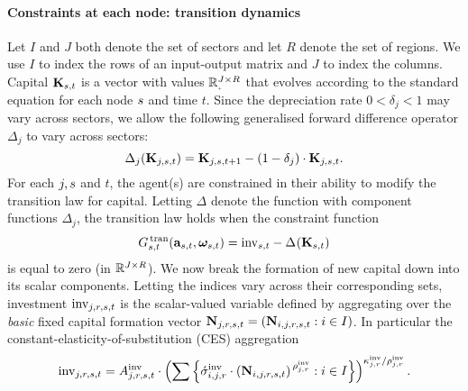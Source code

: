 \documentclass[12pt,a4paper,twoside, draft]{article}
\begin{document}
\paragraph{Constraints at each node: transition dynamics}
Let $I$ and $J$ both denote the set of sectors and let $R$ denote the set of
regions.
We use $I$ to index the rows of an input-output matrix and $J$ to index the
columns.
Capital $\mathbf{K}_{{s}, t}$ is a vector with values
$\nnreal ^ {J \times R}$ that evolves according to the standard equation for
each node ${s}$ and time $t$.
Since the depreciation rate $0 < \delta_{j} < 1$ may vary across sectors, we
allow the following generalised forward difference operator $\Delta_j$ to vary
across sectors:
\[
  \Delta_{j}(\mathbf{K}_{j, {s}, t})
    = \mathbf{K}_{j, {s}, t + 1} -
      (1 - \delta_j) \cdot \mathbf{K}_{j, {s}, t}. 
\]
For each $j, {s} $ and $t$, the agent(s) are constrained in their ability to
modify the transition law for capital.
Letting $\Delta$ denote the function with component functions
$\Delta_{j}$, the transition law holds when the constraint function
\begin{equation}\label{eq-kapital}
  G_{{s}, t}^{\,\textup{tran}}(
    \mathbf{a}_{{s}, t}, \boldsymbol{\omega}_{{s}, t}
  )
    = \textup{inv}_{{s}, t}
      - \Delta_{}(\mathbf{K}_{{s}, t})
\end{equation}
is equal to zero (in $\mathbb R^{J \times R}$).
We now break the formation of new capital down into its scalar components.
Letting the indices vary across their corresponding sets, investment
$\textup{inv}_{j, r, {s}, t}$ is the scalar-valued variable defined by
aggregating over the \emph{basic} fixed capital formation vector
$\mathbf{N}_{j, r, {s}, t} = (\mathbf{N}_{i,j, r, {s}, t}: i \in I)$.
In particular the constant-elasticity-of-substitution (CES) aggregation
\begin{equation}\label{eq-ces-inv}
  \textup{inv}_{j, r, \node, t} = A_{j, r, \node, t}^{\textup{inv}}
    \cdot \left(\sum%
      \left\{
      \acute \sigma_{i,j, r}^{\textup{inv}}
        \cdot \left( \mathbf{N}_{i,j, r, \node, t}\right)
        ^ {\,\rho_{j, r} ^ {\textup{inv}}}
      : i \in I\right\}
    \right) ^ {\kappa_{j, r}^{\textup{inv}} / \rho_{j, r}^{\textup{inv}}}.
\end{equation}
\end{document}
